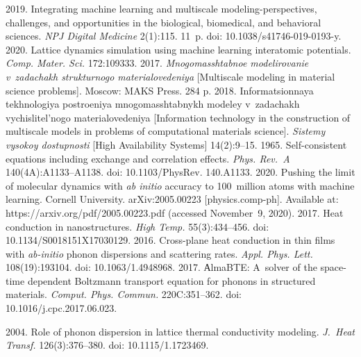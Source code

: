 \begin{multicols}{2}
{{\begin{thebibliography}{99}
   2019. Integrating machine learning and 
multiscale modeling-perspectives, challenges, and opportunities in the biological, biomedical, and behavioral 
sciences. \textit{NPJ Digital Medicine} 2(1):115. 11~p. doi: 10.1038/s41746-019-0193-y.
 2020. Lattice dynamics simulation using 
machine learning interatomic potentials. \textit{Comp. Mater. Sci.} 172:109333.
 2017. \textit{Mnogomasshtabnoe modelirovanie v~zadachakh strukturnogo 
materialovedeniya} [Multiscale modeling in material science problems]. Moscow: MAKS Press. 284 p.
   2018. Informatsionnaya tekhnologiya postroeniya mnogomasshtabnykh modeley 
v~zadachakh vychislitel'nogo materialovedeniya [Information technology in the construction of multiscale models 
in problems of computational materials science]. \textit{Sistemy vysokoy do\-stup\-nosti} [High Availability 
Systems] 14(2):9--15.
   1965. Self-consistent equations including exchange and correlation 
effects. \textit{Phys. Rev.~A} 140(4A):A1133--A1138. doi: 10.1103/\mbox{PhysRev}. 140.A1133.
   2020. Pushing the limit of molecular dynamics with 
  \textit{ab initio} 
accuracy to 100~million atoms with machine learning. 
Cornell University. arXiv:2005.00223 [physics.comp-ph]. Available at: {\sf 
https://arxiv.org/pdf/2005.00223.pdf} (accessed November~9, 2020).
   2017. Heat 
conduction in nanostructures. \textit{High 
Temp.} 55(3):434--456. doi: 10.1134/S0018151X17030129.
   2016. Cross-plane heat conduction in thin films with 
  \textit{ab-initio} phonon dispersions and scattering rates. \textit{Appl. Phys. Lett.} 108(19):193104. doi: 
10.1063/1.4948968.
2017. АlmaBTE: A~solver of the space-time dependent Boltzmann transport equation for phonons in structured 
materials. \textit{Comput. Phys. Commun.} 220C:351--362. doi: 10.1016/j.cpc.2017.06.023.

   2004. Role of phonon dispersion in lattice 
thermal conductivity modeling. \textit{J.~Heat Transf.} 126(3):376--380. doi: 10.1115/1.1723469.


\end{thebibliography}}}
\end{multicols}
